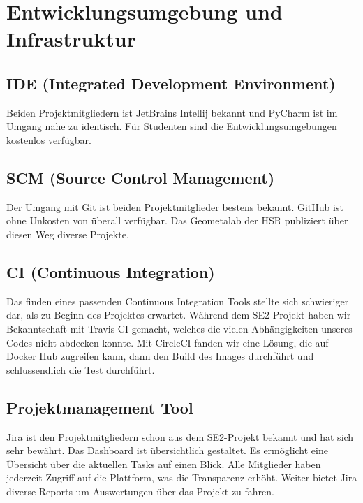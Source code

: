 \section{Entwicklungsumgebung und Infrastruktur}
\subsection{IDE (Integrated Development Environment)}
Beiden Projektmitgliedern ist JetBrains Intellij bekannt und \Gls{PyCharm} ist im Umgang nahe zu identisch.
Für Studenten sind die Entwicklungsumgebungen kostenlos verfügbar.
\subsection{SCM (Source Control Management)}
Der Umgang mit \Gls{Git} ist beiden Projektmitglieder bestens bekannt.
\Gls{GitHub} ist ohne Unkosten von überall verfügbar.
Das Geometalab der HSR publiziert über diesen Weg diverse Projekte.

\subsection{CI (Continuous Integration)}
Das finden eines passenden Continuous Integration Tools stellte sich schwieriger dar, als zu Beginn des Projektes erwartet. Während dem SE2 Projekt haben wir Bekanntschaft mit Travis CI gemacht, welches die vielen Abhängigkeiten unseres Codes nicht abdecken konnte. Mit CircleCI fanden wir eine Lösung, die auf Docker Hub zugreifen kann, dann den Build des Images durchführt und schlussendlich die Test durchführt.

\subsection{Projektmanagement Tool}
\Gls{Jira} ist den Projektmitgliedern schon aus dem SE2-Projekt bekannt und hat sich sehr bewährt.
Das Dashboard ist übersichtlich gestaltet. Es ermöglicht eine Übersicht über die aktuellen Tasks auf einen Blick.
Alle Mitglieder haben jederzeit Zugriff auf die Plattform, was die Transparenz erhöht.
Weiter bietet Jira diverse Reports um Auswertungen über das Projekt zu fahren.
